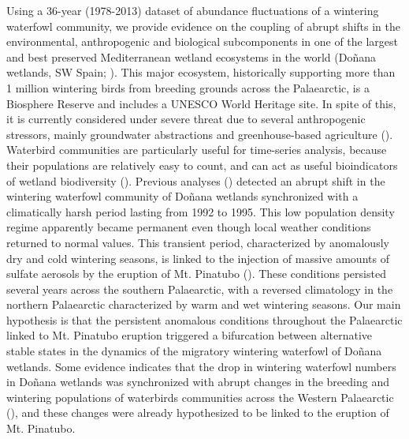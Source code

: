 \documentclass[12pt]{article}
\begin{document}
Using a 36-year (1978-2013) dataset of abundance fluctuations of a wintering waterfowl community, we provide evidence on the coupling of abrupt shifts in the environmental, anthropogenic and biological subcomponents in one of the largest and best preserved Mediterranean wetland ecosystems in the world (Doñana wetlands, SW Spain; \cite{Rendon2008,Almaraz2012,Green2018}). This major ecosystem, historically supporting more than 1 million wintering birds from breeding grounds across the Palaearctic, is a Biosphere Reserve and includes a UNESCO World Heritage site. In spite of this, it is currently considered under severe threat due to several anthropogenic stressors, mainly groundwater abstractions and greenhouse-based agriculture (\cite{Scheffer2015a,Green2017a,Green2018,Camacho2022,Santamaria2023,Green2024}). Waterbird communities are particularly useful for time-series analysis, because their populations are relatively easy to count, and can act as useful bioindicators of wetland biodiversity (\cite{Green2014}). Previous analyses (\cite{Almaraz2012}) detected an abrupt shift in the wintering waterfowl community of Doñana wetlands synchronized with a climatically harsh period lasting from 1992 to 1995. This low population density regime apparently became permanent even though local weather conditions returned to normal values. This transient period, characterized by anomalously dry and cold wintering seasons, is linked to the injection of massive amounts of sulfate aerosols by the eruption of Mt. Pinatubo (\cite{Robock2002,Soden2002,Booth2012}). These conditions persisted several years across the southern Palaearctic, with a reversed climatology in the northern Palaearctic characterized by warm and wet wintering seasons. Our main hypothesis is that the persistent anomalous conditions throughout the Palaearctic linked to Mt. Pinatubo eruption triggered a bifurcation between alternative stable states in the dynamics of the migratory wintering waterfowl of Doñana wetlands. Some evidence indicates that the drop in wintering waterfowl numbers in Doñana wetlands was synchronized with abrupt changes in the breeding and wintering populations of waterbirds communities across the Western Palaearctic (\cite{Ganter2000,Mitchell2008,Christensen2014}), and these changes were already hypothesized to be linked to the eruption of Mt. Pinatubo. \\
\end{document}
